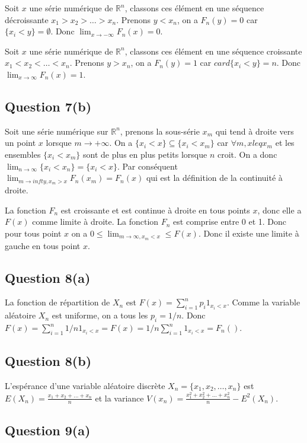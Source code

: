 \documentclass[]{book}
\theoremstyle{definition}
\newcommand{\bb}[1]{\mathbb{#1}}
\newcommand{\R}{\bb{R}}
\begin{document}
Soit $x$ une s\'erie num\'erique de $\R^n$, classons ces \'el\'ement en une s\'equence d\'ecroissante $x_1 > x_2 > \ldots > x_n$. Prenons $y < x_n$, on a $F_n(y) = 0$ car $\{ x_i < y \} = \emptyset$. Donc $\lim_{x \to -\infty}F_n(x) = 0$.

Soit $x$ une s\'erie num\'erique de $\R^n$, classons ces \'el\'ement en une s\'equence croissante $x_1 < x_2 < \ldots < x_n$. Prenons $y > x_n$, on a $F_n(y) = 1$ car $card \{ x_i < y \} = n$. Donc $\lim_{x \to \infty}F_n(x) = 1$.

\subsection*{Question 7(b)}
Soit une s\'erie num\'erique sur $\R^n$, prenons la sous-s\'erie $x_m$ qui tend \`a droite vers un point $x$ lorsque $m \to +\infty$. On a $\{ x_i < x\} \subseteq \{x_i < x_m\}$ car $\forall m, x leq x_m$ et les ensembles $\{x_i < x_m\}$ sont de plus en plus petits lorsque $n$ croit. On a donc $\lim_{n \to \infty} \{ x_i < x_n\} = \{x_i < x\}$. Par cons\'equent $\lim_{m \to infty, x_m > x} F_n(x_m) = F_n(x)$ qui est la d\'efinition de la continuit\'e \`a droite.

La fonction $F_n$ est croissante et est continue \`a droite en tous points $x$, donc elle a $F(x)$ comme limite \`a droite. La fonction $F_n$ est comprise entre 0 et 1. Donc pour tous point $x$ on a $0 \leq \lim_{m \to \infty, x_m < x} \leq F(x)$.  Donc il existe une limite \`a gauche en tous point $x$.

\subsection*{Question 8(a)}
La fonction de r\'epartition de $X_n$ est $F(x) = \sum_{i=1}^{n} p_i 1_{x_i < x}$. Comme la variable al\'eatoire $X_n$ est uniforme, on a tous les $p_i = 1/n$. Donc $F(x) = \sum_{i=1}^{n} 1/n 1_{x_i < x} = F(x) = 1/n \sum_{i=1}^{n} 1_{x_i < x} = F_n()$.

\subsection*{Question 8(b)}
L'esp\'erance d'une variable al\'eatoire discr\`ete $X_n = \{x_1, x_2, \ldots, x_n\}$ est $E(X_n) = \frac{x_1+x_2+\ldots + x_n}{n}$ et la variance $V(x_n) = \frac{x_1^2+x_2^2+\ldots + x_n^2}{n} - E^2(X_n)$.

\subsection*{Question 9(a)}
\end{document}
